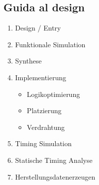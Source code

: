         \subsection{Guida al design}
            \begin{minipage}[t]{0.48\columnwidth}
                \vspace{0pt} %
                \begin{enumerate}
                    \item Design / Entry
                    \item Funktionale Simulation
                    \item Synthese
                    \item Implementierung
                    \begin{itemize}
                        \item Logikoptimierung
                        \item Platzierung
                        \item Verdrahtung
                    \end{itemize}
                    \item Timing Simulation
                    \item Statische Timing Analyse
                    \item Herstellungsdatenerzeugen
                \end{enumerate}
            \end{minipage}
            \hfill
